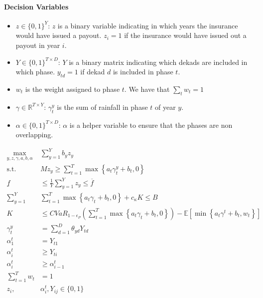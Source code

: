 \documentclass[11pt]{article}
\begin{document}
    \paragraph{Decision Variables}
      \begin{itemize}
        \item $z \in \{ 0,1\}^Y$: $z$ is a binary variable indicating in which years the insurance would have issued a payout. $z_i = 1$ if the insurance would have issued out a payout in year $i$. 
        \item $Y \in \{ 0,1\}^{T \times D}$: $Y$ is a binary matrix indicating which dekads are included in which phase. $y_{td} = 1$ if dekad $d$ is included in phase $t$. 
        \item $w_t$ is the weight assigned to phase $t$. We have that $\sum_t w_t = 1$ 
        \item $\gamma \in \mathbb{R}^{T \times Y}$: $\gamma^y_t$ is the sum of rainfall in phase $t$ of year $y$. 
        \item $\alpha \in \{ 0,1\}^{T \times D}$: $\alpha$ is a helper variable to ensure that the phases are non overlapping.
      \end{itemize}
    
    \begin{align}
      \max_{y,z,\gamma,a,b,\alpha} &\sum_{y=1}^{Y} b_y z_y \\
        \text{s.t.   } & Mz_y \geq \sum_{t=1}^{T} \max \left \{a_t \gamma_t^y + b_t,0 \right \}\\
        \underline{f} &\leq \frac{1}{Y} \sum_{y=1}^{Y} z_y \leq \overline{f}\\
        \sum_{y=1}^{Y} & \sum_{t=1}^{T} \max \left \{a_t \gamma_t + b_t,0 \right \} + c_{\kappa}K \leq B\\
        K &\leq CVaR_{1-\epsilon_P} \left( \sum_{t=1}^{T} \max \left \{ a_t \gamma_t + b_t,0 \right \} \right) - \mathbb{E} \left [ \min \left \{ a_t \gamma^t +b_t, w_t \right \} \right ]\\
        \gamma_t^y &= \sum_{d=1}^{D} \theta_{yd}Y_{td} \\
        \alpha^t_1 &= Y_{t1} \\
        \alpha^t_i &\geq Y_{ti} \\
        \alpha^t_i &\geq \alpha^t_{i-1}\\ 
        \sum_{t=1}^T w_t &= 1\\
        z_i, & \alpha^t_i, Y_{ij} \in \{ 0,1\}
    \end{align}
\end{document}
